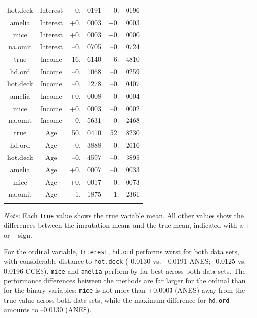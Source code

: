 \documentclass[12pt,econ]{sources/authesis}
\begin{document}
\begin{table}[!htbp]
\begin{threeparttable}
\begin{tabular}{ccr@{}lr@{}l}
 hot.deck & Interest & --0.&0191 & --0.&0196 \\ 
 amelia & Interest & +0.&0003 & +0.&0003 \\ 
 mice & Interest & +0.&0003 & +0.&0000 \\
 na.omit & Interest & --0.&0705 & --0.&0724 \\
 true & Income & 16.&6140 & 6.&4810 \\
 hd.ord & Income & --0.&1068 & --0.&0259 \\
 hot.deck & Income & --0.&1278 & --0.&0407 \\
 amelia & Income & +0.&0008 & --0.&0004 \\
 mice & Income & +0.&0003 & --0.&0002 \\
 na.omit & Income & --0.&5631 & --0.&2468 \\
 true & Age & 50.&0410 & 52.&8230 \\
 hd.ord & Age & --0.&3888 & --0.&2616 \\
 hot.deck & Age & --0.&4597 & --0.&3895 \\
 amelia & Age & +0.&0007 & --0.&0033 \\
 mice & Age & +0.&0017 & --0.&0073 \\
 na.omit & Age & --1.&1875 & --1.&2361 \\
 \hline \\[-1.8ex]  
\end{tabular} 
\begin{tablenotes}
\footnotesize{\textit{Note:} Each \texttt{true} value shows the true variable mean. All other values show the differences between the imputation means and the true mean, indicated with a + or -- sign.}
\end{tablenotes}
\end{threeparttable}
\end{table}
For the ordinal variable, \texttt{Interest}, \texttt{hd.ord} performs worst for both data sets, with considerable distance to \texttt{hot.deck} (--0.0130 vs.~--0.0191 ANES; --0.0125 vs.~--0.0196 CCES). \texttt{mice} and \texttt{amelia} perform by far best across both data sets. The performance differences between the methods are far larger for the ordinal than for the binary variables: \texttt{mice} is not more than +0.0003 (ANES) away from the true value across both data sets, while the maximum difference for \texttt{hd.ord} amounts to --0.0130 (ANES).
\end{document}

